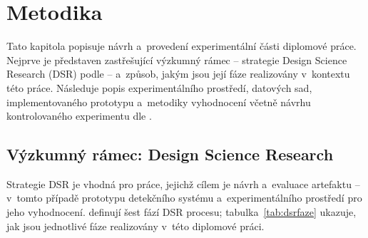 \chapter{Metodika}
\label{chap:metodika}

Tato kapitola popisuje návrh a~provedení experimentální části diplomové práce. Nejprve je představen zastřešující výzkumný rámec -- strategie Design Science Research (DSR) podle \textcite{Peffers2007} -- a~způsob, jakým jsou její fáze realizovány v~kontextu této práce. Následuje popis experimentálního prostředí, datových sad, implementovaného prototypu a~metodiky vyhodnocení včetně návrhu kontrolovaného experimentu dle \textcite{Wohlin2012}.

\section{Výzkumný rámec: Design Science Research}
\label{sec:dsr}

Strategie DSR je vhodná pro práce, jejichž cílem je návrh a~evaluace artefaktu -- v~tomto případě prototypu detekčního systému a~experimentálního prostředí pro jeho vyhodnocení. \textcite{Peffers2007} definují šest fází DSR procesu; tabulka~\ref{tab:dsrfaze} ukazuje, jak jsou jednotlivé fáze realizovány v~této diplomové práci.

